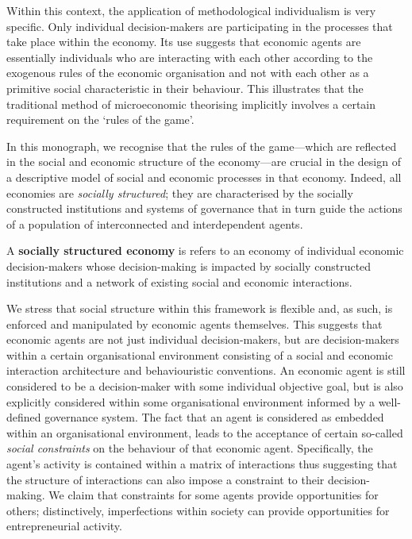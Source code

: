 Within this context, the application of methodological individualism is very specific. Only individual decision-makers are participating in the processes that take place within the economy. Its use suggests that economic agents are essentially individuals who are interacting with each other according to the exogenous rules of the economic organisation and not with each other as a primitive social characteristic in their behaviour. This illustrates that the traditional method of microeconomic theorising implicitly involves a certain requirement on the `rules of the game'.

\medskip \noindent In this monograph, we recognise that the rules of the game---which are reflected in the social and economic structure of the economy---are crucial in the design of a descriptive model of social and economic processes in that economy. Indeed, all economies are \emph{socially structured}; they are characterised by the socially constructed institutions and systems of governance that in turn guide the actions of a population of interconnected and interdependent agents.

\begin{definition}
A \textbf{socially structured economy} is refers to an economy of individual economic decision-makers whose decision-making is impacted by socially constructed institutions and a network of existing social and economic interactions.
\end{definition}

We stress that social structure within this framework is flexible and, as such, is enforced and manipulated by economic agents themselves. This suggests that economic agents are not just individual decision-makers, but are decision-makers within a certain organisational environment consisting of a social and economic interaction architecture and behaviouristic conventions. An economic agent is still considered to be a decision-maker with some individual objective goal, but is also explicitly considered within some organisational environment informed by a well-defined governance system. The fact that an agent is considered as embedded within an organisational environment, leads to the acceptance of certain so-called \emph{social constraints} on the behaviour of that economic agent. Specifically, the agent's activity is contained within a matrix of interactions thus suggesting that the structure of interactions can also impose a constraint to their decision-making. We claim that constraints for some agents provide opportunities for others; distinctively, imperfections within society can provide opportunities for entrepreneurial activity.

